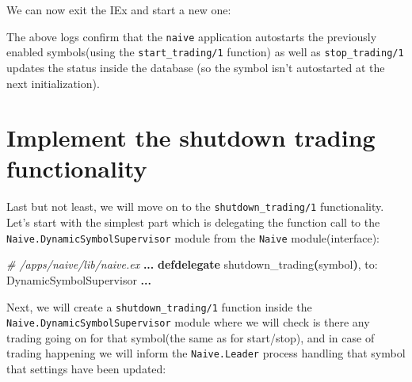 \documentclass[
  oneside]{book}
\newenvironment{Shaded}{\begin{snugshade}}{\end{snugshade}}
\newcommand{\AttributeTok}[1]{\textcolor[rgb]{0.13,0.29,0.53}{#1}}
\newcommand{\CommentTok}[1]{\textcolor[rgb]{0.56,0.35,0.01}{\textit{#1}}}
\newcommand{\ConstantTok}[1]{\textcolor[rgb]{0.56,0.35,0.01}{#1}}
\newcommand{\ControlFlowTok}[1]{\textcolor[rgb]{0.13,0.29,0.53}{\textbf{#1}}}
\newcommand{\ErrorTok}[1]{\textcolor[rgb]{0.64,0.00,0.00}{\textbf{#1}}}
\newcommand{\ExtensionTok}[1]{#1}
\newcommand{\FunctionTok}[1]{\textcolor[rgb]{0.13,0.29,0.53}{\textbf{#1}}}
\newcommand{\KeywordTok}[1]{\textcolor[rgb]{0.13,0.29,0.53}{\textbf{#1}}}
\newcommand{\NormalTok}[1]{#1}
\newcommand{\OperatorTok}[1]{\textcolor[rgb]{0.81,0.36,0.00}{\textbf{#1}}}
\newcommand{\PreprocessorTok}[1]{\textcolor[rgb]{0.56,0.35,0.01}{\textit{#1}}}
\newcommand{\SpecialStringTok}[1]{\textcolor[rgb]{0.31,0.60,0.02}{#1}}
\newcommand{\VariableTok}[1]{\textcolor[rgb]{0.00,0.00,0.00}{#1}}
\begin{document}
We can now exit the IEx and start a new one:

\begin{Shaded}
\end{Shaded}

The above logs confirm that the \texttt{naive} application autostarts the previously enabled symbols(using the \texttt{start\_trading/1} function) as well as \texttt{stop\_trading/1} updates the status inside the database (so the symbol isn't autostarted at the next initialization).

\section{Implement the shutdown trading functionality}\label{implement-the-shutdown-trading-functionality}

Last but not least, we will move on to the \texttt{shutdown\_trading/1} functionality. Let's start with the simplest part which is delegating the function call to the \texttt{Naive.DynamicSymbolSupervisor} module from the \texttt{Naive} module(interface):

\begin{Shaded}
\begin{Highlighting}[]
  \CommentTok{\# /apps/naive/lib/naive.ex}
  \OperatorTok{...}
  \KeywordTok{defdelegate}\NormalTok{ shutdown\_trading}\FunctionTok{(}\NormalTok{symbol}\FunctionTok{)}\NormalTok{, }\VariableTok{to:} \ConstantTok{DynamicSymbolSupervisor}
  \OperatorTok{...}
\end{Highlighting}
\end{Shaded}

Next, we will create a \texttt{shutdown\_trading/1} function inside the \texttt{Naive.DynamicSymbolSupervisor} module where we will check is there any trading going on for that symbol(the same as for start/stop), and in case of trading happening we will inform the \texttt{Naive.Leader} process handling that symbol that settings have been updated:
\end{document}
